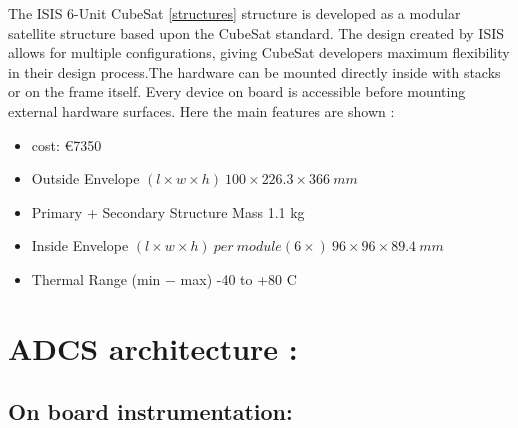 \documentclass[11pt]{article}
\begin{document}
The ISIS 6-Unit CubeSat \ref{structures} structure is developed as a modular satellite structure based upon the CubeSat standard. The design created by ISIS allows for multiple  configurations, giving CubeSat developers maximum flexibility in their design process.The hardware can be mounted directly inside with stacks or on the frame itself. Every device on board is accessible before mounting external hardware surfaces. Here the main features are shown  \cite{structure}:
\begin{multicols}{2}
\begin{itemize}
\item cost: \euro{7350}
\item Outside Envelope $ (l\times w\times h) \ 100\times 226.3 \times 366 \ mm $
\item Primary + Secondary Structure Mass 	1.1 kg
\item Inside Envelope $(l\times w\times h) \ per \ module (6 \times) \	96\times 96 \times 89.4 	\ mm$
\item Thermal Range (min $-$ max) -40 to +80 	\degree C
\end{itemize}
\end{multicols}



\section{ADCS architecture :}
\subsection{On board instrumentation:}
\end{document}
